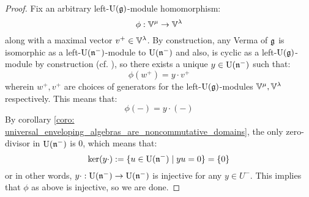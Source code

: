             \begin{proof}
                Fix an arbitrary left-$\mathrm{U}(\mathfrak{g})$-module homomorphism:
                    $$\phi: \mathbb{V}^{\mu} \to \mathbb{V}^{\lambda}$$
                along with a maximal vector $v^+ \in \mathbb{V}^{\lambda}$. By construction, any Verma of $\mathfrak{g}$ is isomorphic as a left-$\mathrm{U}(\mathfrak{n}^-)$-module to $\mathrm{U}(\mathfrak{n}^-)$ and also, is cyclic as a left-$\mathrm{U}(\mathfrak{g})$-module by construction (cf. \cite[Subsection 20.2]{humphreys_lie_algebras}), so there exists a unique $y \in \mathrm{U}(\mathfrak{n}^-)$ such that:
                    $$\phi(w^+) = y \cdot v^+$$
                wherein $w^+, v^+$ are choices of generators for the left-$\mathrm{U}(\mathfrak{g})$-modules $\mathbb{V}^{\mu}, \mathbb{V}^{\lambda}$ respectively. This means that:
                    $$\phi(-) = y \cdot (-)$$
                By corollary \ref{coro: universal_enveloping_algebras_are_noncommutative_domains}, the only zero-divisor in $\mathrm{U}(\mathfrak{n}^-)$ is $0$, which means that:
                    $$\ker(y \cdot) := \{u \in \mathrm{U}(\mathfrak{n}^-) \mid yu = 0\} = \{0\}$$
                or in other words, $y \cdot: \mathrm{U}(\mathfrak{n}^-) \to \mathrm{U}(\mathfrak{n}^-)$ is injective for any $y \in U^-$. This implies that $\phi$ as above is injective, so we are done. 
            \end{proof}
            
